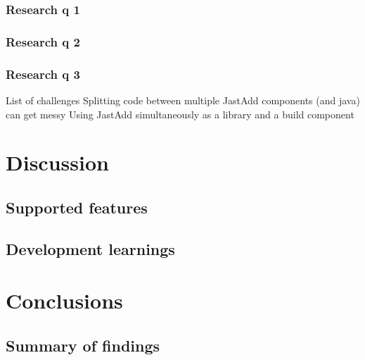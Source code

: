 \documentclass[nofilelist]{cslthse-msc}
\begin{document}
\subsection{Research q 1}
\subsection{Research q 2}
\subsection{Research q 3}
List of challenges %
  Splitting code between multiple JastAdd components (and java) can get messy
  Using JastAdd simultaneously as a library and a build component


\chapter{Discussion} %
\section{Supported features}
\section{Development learnings}

\chapter{Conclusions} %
\section{Summary of findings}
\end{document}

